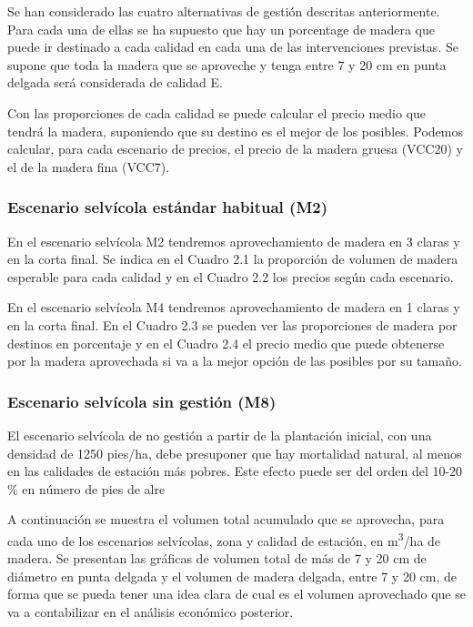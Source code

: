 \documentclass[
]{article}
\begin{document}
Se han considerado las cuatro alternativas de gestión descritas
anteriormente. Para cada una de ellas se ha supuesto que hay un
porcentage de madera que puede ir destinado a cada calidad en cada una
de las intervenciones previstas. Se supone que toda la madera que se
aproveche y tenga entre 7 y 20 cm en punta delgada será considerada de
calidad E.

Con las proporciones de cada calidad se puede calcular el precio medio
que tendrá la madera, suponiendo que su destino es el mejor de los
posibles. Podemos calcular, para cada escenario de precios, el precio de
la madera gruesa (VCC20) y el de la madera fina (VCC7).

\hypertarget{escenario-selvuxedcola-estuxe1ndar-habitual-m2}{%
\subsubsection{Escenario selvícola estándar habitual
(M2)}\label{escenario-selvuxedcola-estuxe1ndar-habitual-m2}}

En el escenario selvícola M2 tendremos aprovechamiento de madera en 3
claras y en la corta final. Se indica en el Cuadro 2.1 la proporción de
volumen de madera esperable para cada calidad y en el Cuadro 2.2 los
precios según cada escenario.

En el escenario selvícola M4 tendremos aprovechamiento de madera en 1
claras y en la corta final. En el Cuadro 2.3 se pueden ver las
proporciones de madera por destinos en porcentaje y en el Cuadro 2.4 el
precio medio que puede obtenerse por la madera aprovechada si va a la
mejor opción de las posibles por su tamaño.

\hypertarget{escenario-selvuxedcola-sin-gestiuxf3n-m8}{%
\subsubsection{Escenario selvícola sin gestión
(M8)}\label{escenario-selvuxedcola-sin-gestiuxf3n-m8}}

El escenario selvícola de no gestión a partir de la plantación inicial,
con una densidad de 1250 pies/ha, debe presuponer que hay mortalidad
natural, al menos en las calidades de estación más pobres. Este efecto
puede ser del orden del 10-20 \% en número de pies de alre

A continuación se muestra el volumen total acumulado que se aprovecha,
para cada uno de los escenarios selvícolas, zona y calidad de estación,
en m\textsuperscript{3}/ha de madera. Se presentan las gráficas de
volumen total de más de 7 y 20 cm de diámetro en punta delgada y el
volumen de madera delgada, entre 7 y 20 cm, de forma que se pueda tener
una idea clara de cual es el volumen aprovechado que se va a
contabilizar en el análisis económico posterior.
\end{document}
